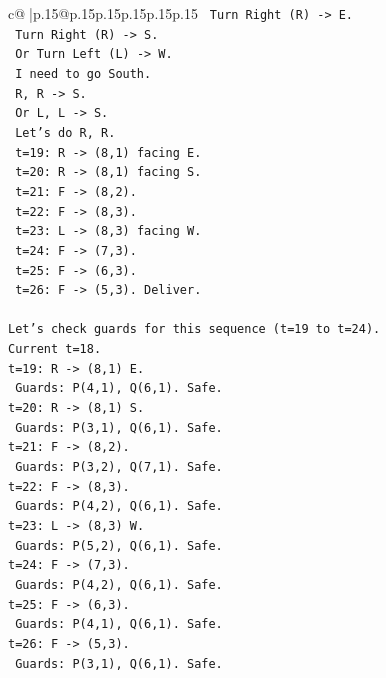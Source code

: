 \documentclass{article}
\begin{document}
{\begin{supertabular}{c@{$\;$}|p{.15\linewidth}@{}p{.15\linewidth}p{.15\linewidth}p{.15\linewidth}p{.15\linewidth}p{.15\linewidth}}
{{{\texttt{   Turn Right (R) {-}> E.} \\
\texttt{   Turn Right (R) {-}> S.} \\
\texttt{   Or Turn Left (L) {-}> W.} \\
\texttt{   I need to go South.} \\
\texttt{   R, R {-}> S.} \\
\texttt{   Or L, L {-}> S.} \\
\texttt{   Let's do R, R.} \\
\texttt{   t=19: R {-}> (8,1) facing E.} \\
\texttt{   t=20: R {-}> (8,1) facing S.} \\
\texttt{   t=21: F {-}> (8,2).} \\
\texttt{   t=22: F {-}> (8,3).} \\
\texttt{   t=23: L {-}> (8,3) facing W.} \\
\texttt{   t=24: F {-}> (7,3).} \\
\texttt{   t=25: F {-}> (6,3).} \\
\texttt{   t=26: F {-}> (5,3). Deliver.} \\
\\ 
\texttt{Let's check guards for this sequence (t=19 to t=24).} \\
\texttt{Current t=18.} \\
\texttt{t=19: R {-}> (8,1) E.} \\
\texttt{   Guards: P(4,1), Q(6,1). Safe.} \\
\texttt{t=20: R {-}> (8,1) S.} \\
\texttt{   Guards: P(3,1), Q(6,1). Safe.} \\
\texttt{t=21: F {-}> (8,2).} \\
\texttt{   Guards: P(3,2), Q(7,1). Safe.} \\
\texttt{t=22: F {-}> (8,3).} \\
\texttt{   Guards: P(4,2), Q(6,1). Safe.} \\
\texttt{t=23: L {-}> (8,3) W.} \\
\texttt{   Guards: P(5,2), Q(6,1). Safe.} \\
\texttt{t=24: F {-}> (7,3).} \\
\texttt{   Guards: P(4,2), Q(6,1). Safe.} \\
\texttt{t=25: F {-}> (6,3).} \\
\texttt{   Guards: P(4,1), Q(6,1). Safe.} \\
\texttt{t=26: F {-}> (5,3).} \\
\texttt{   Guards: P(3,1), Q(6,1). Safe.} \\
}}}
\end{supertabular}}
\end{document}
